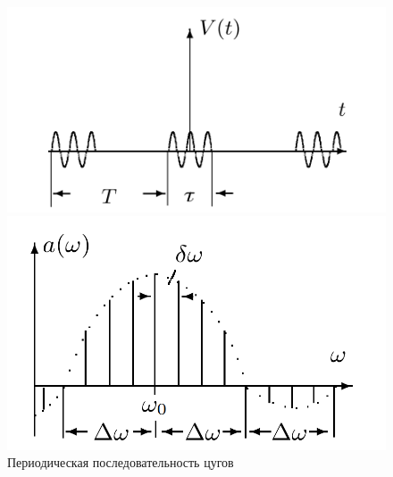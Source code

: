 \documentclass[a4paper]{article}
\begin{document}
\begin{figure}[h]
	\begin{minipage}{0.49\linewidth}
		\centering
		\includegraphics[width=0.9\linewidth]{"zug"}
	\end{minipage}
	\begin{minipage}{0.49\linewidth}
		\centering
		\includegraphics[width=0.9\linewidth]{"spzug"}
	\end{minipage}
	\caption{Периодическая последовательность цугов}
	\label{fig:zug}
\end{figure}
\end{document}
